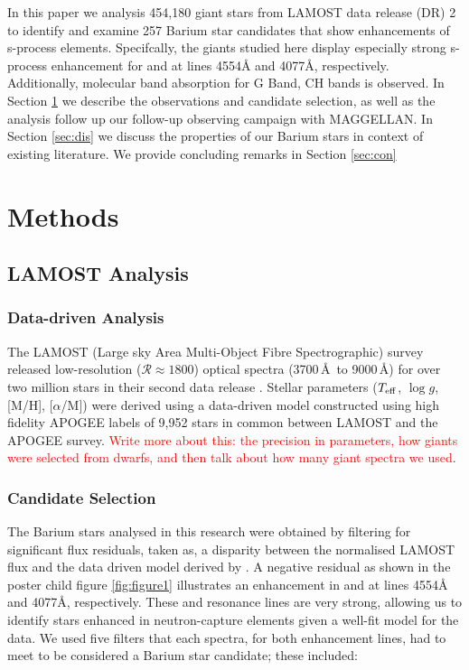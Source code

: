 \documentclass[a4paper,fleqn,usenatbib]{mnras}
\newcommand{\todo}[1]{\textcolor{red}{#1}}
\begin{document}
In this paper we analysis 454,180 giant stars from LAMOST data release (DR) 2 to identify and examine 257 Barium star candidates that show enhancements of s-process elements. Specifcally, the giants studied here display especially strong s-process enhancement for  and  at lines 4554\AA \hspace{0.2mm} and 4077\AA, respectively. Additionally, molecular band absorption for G Band, CH bands is observed. In Section \ref{sec:methods} we describe the observations and candidate selection, as well as the analysis follow up our follow-up observing campaign with MAGGELLAN. In Section \ref{sec:dis} we discuss the properties of our Barium stars in context of existing literature. We provide concluding remarks in Section \ref{sec:con}

\section{Methods} \label{sec:methods}
\subsection{LAMOST Analysis}
\subsubsection{Data-driven Analysis}
The LAMOST (Large sky Area Multi-Object Fibre Spectrographic) survey released low-resolution ($\mathcal{R} \approx 1800$) optical spectra (3700\,\AA\ to 9000\,\AA) for over two million stars in their second data release \citep{luo2015}. Stellar parameters ($T_{\rm eff}$, $\log{g}$, [M/H], [$\alpha$/M]) were derived using a data-driven model constructed using high fidelity APOGEE labels of 9,952 stars in common between LAMOST and the APOGEE survey. \todo{Write more about this: the precision in parameters, how giants were selected from dwarfs, and then talk about how many giant spectra we used}.

\subsubsection{Candidate Selection} \label{sec:cand}
The Barium stars analysed in this research were obtained by filtering for significant flux residuals, taken as, a disparity between the normalised LAMOST flux and the data driven model derived by \citet{ho2017}. A negative residual as shown in the poster child figure \ref{fig:figure1} illustrates an enhancement in  and  at lines 4554\AA \hspace{0.2mm} and 4077\AA, respectively. These  and  resonance lines are very strong, allowing us to identify stars enhanced in neutron-capture elements given a well-fit model for the data. We used five filters that each spectra, for both enhancement lines, had to meet to be considered a Barium star candidate; these included:
\end{document}
